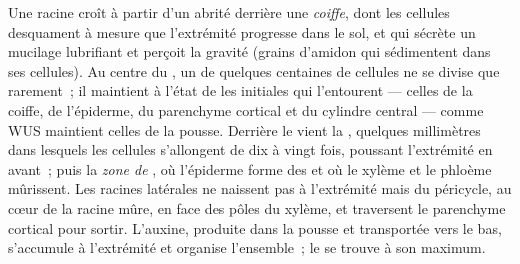 \begin{proposition}\label{prop:b2:plant-meristems:ram}
Une racine croît à partir d'un  abrité derrière une
\emph{coiffe}, dont les cellules desquament à mesure que l'extrémité
progresse dans le sol, et qui sécrète un mucilage lubrifiant et perçoit
la gravité (grains d'amidon qui sédimentent dans ses cellules). Au
centre du , un \emph{} de quelques centaines
de cellules ne se divise que rarement~; il maintient à l'état de
 les initiales qui l'entourent --- celles de la coiffe,
de l'épiderme, du parenchyme cortical et du cylindre central --- comme
WUS maintient celles de la pousse. Derrière le  vient la
\emph{}, quelques millimètres dans lesquels les
cellules s'allongent de dix à vingt fois, poussant l'extrémité en
avant~; puis la \emph{zone de }, où l'épiderme forme des
\emph{} et où le xylème et le phloème mûrissent. Les
racines latérales ne naissent pas à l'extrémité mais du péricycle, au
cœur de la racine mûre, en face des pôles du xylème, et traversent le
parenchyme cortical pour sortir. L'auxine, produite dans la pousse et
transportée vers le bas, s'accumule à l'extrémité et organise
l'ensemble~; le  se trouve à son maximum.
\end{proposition}

